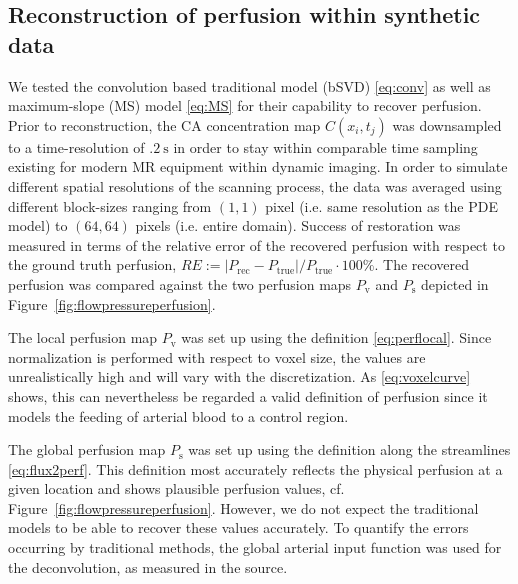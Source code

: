 \documentclass[journal,twocolumn]{IEEEtran}
\newcommand{\Perf}{P}
\newcommand{\Perfv}{P_{\mathrm{v}}}
\newcommand{\Perfs}{P_{\mathrm{s}}}
\begin{document}
	\subsection{Reconstruction of perfusion within synthetic data}\label{sec:RecPhantom}


	We tested the convolution based traditional model (bSVD) \eqref{eq:conv} as well as maximum-slope (MS) model \eqref{eq:MS} for their capability to recover perfusion.
	Prior to reconstruction, the CA concentration map $C(x_i,t_j)$ was downsampled to a time-resolution of $\SI{.2}{\second}$ in order to stay within comparable time sampling existing for modern MR equipment within dynamic imaging.
	In order to simulate different spatial resolutions of the scanning process, the data was averaged using different block-sizes ranging from $(1,1)$ pixel (i.e. same resolution as the PDE model) to $(64,64)$ pixels (i.e. entire domain).		
	Success of restoration was measured in terms of the relative error of the recovered perfusion with respect to the ground truth perfusion, $RE := \vert \Perf_{\mathrm{rec}} - \Perf_{\mathrm{true}}\vert/\Perf_{\mathrm{true}}\cdot 100\%$.
	The recovered perfusion was compared against the two perfusion maps $\Perfv$ and $\Perfs$ depicted in Figure~\ref{fig:flowpressureperfusion}.
	
	The local perfusion map $\Perfv$ was set up using the definition \eqref{eq:perflocal}. 
	Since normalization is performed with respect to voxel size, the values are unrealistically high and will vary with the discretization.
	As \eqref{eq:voxelcurve} shows, this can nevertheless be regarded a valid definition of perfusion since it models the feeding of arterial blood to a control region.

	The global perfusion map $\Perfs$ was set up using the definition along the streamlines \eqref{eq:flux2perf}.
	This definition most accurately reflects the physical perfusion at a given location and shows plausible perfusion values, cf. Figure~\ref{fig:flowpressureperfusion}.
	However, we do not expect the traditional models to be able to recover these values accurately.
	To quantify the errors occurring by traditional methods, the global arterial input function was used for the deconvolution, as measured in the source.
	
\end{document}
